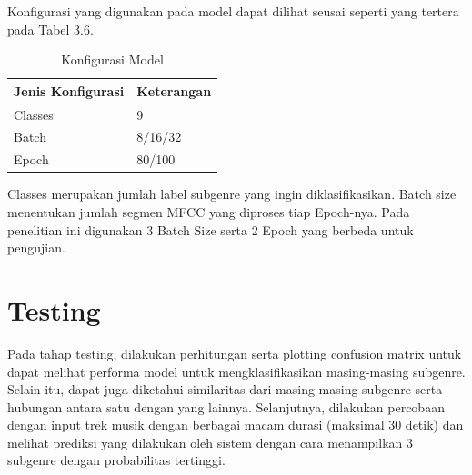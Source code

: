 Konfigurasi yang digunakan pada model dapat dilihat seusai seperti yang tertera pada Tabel 3.6.

\begin{table}[h]
	
	\centering
	
	\caption{Konfigurasi Model}
	
	\begin{tabular}{|l|l|}
		\hline
		\textbf{Jenis Konfigurasi} & \textbf{Keterangan} \\ \hline
		Classes                    & 9                   \\ \hline
		Batch                      & 8/16/32                 \\ \hline
		Epoch                      & 80/100                  \\ \hline
	\end{tabular}

	\label{fig:konfigurasimodel}
\end{table}

Classes merupakan jumlah label subgenre yang ingin diklasifikasikan. Batch size menentukan jumlah segmen MFCC yang diproses tiap Epoch-nya. Pada penelitian ini digunakan 3 Batch Size serta 2 Epoch yang berbeda untuk pengujian. 

\section{Testing}
\label{sec:testing}

Pada tahap testing, dilakukan perhitungan serta plotting confusion matrix untuk dapat melihat performa model untuk mengklasifikasikan masing-masing subgenre. Selain itu, dapat juga diketahui similaritas dari masing-masing subgenre serta hubungan antara satu dengan yang lainnya. Selanjutnya, dilakukan percobaan dengan input trek musik dengan berbagai macam durasi (maksimal 30 detik) dan melihat prediksi yang dilakukan oleh sistem dengan cara menampilkan 3 subgenre dengan probabilitas tertinggi.



